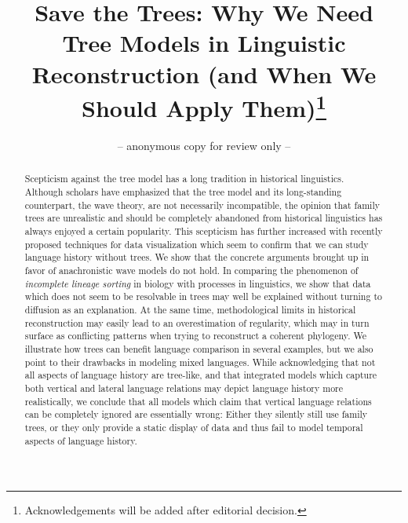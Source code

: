 \documentclass[svgnames,12pt]{scrartcl}
\title{Save the Trees: Why We Need Tree Models in Linguistic Reconstruction (and When We Should Apply Them)\footnote{Acknowledgements will be added after editorial decision.}}
\author{-- anonymous copy for review only --}
\begin{document}
\maketitle

\begin{abstract}
  \small
Scepticism against the tree model has a long tradition in historical linguistics.  
Although scholars
have emphasized that the tree model and its long-standing counterpart, the wave theory, are not
necessarily incompatible, the opinion that family trees are unrealistic and should be completely
abandoned from historical linguistics has always enjoyed a certain popularity. 
This scepticism has
further increased with recently proposed techniques for data visualization which seem to confirm
that we can study language history without trees.  
We show that the concrete arguments brought up in favor
of anachronistic wave models do not hold. In comparing the phenomenon of \emph{incomplete lineage
sorting} in biology with processes in linguistics, we show that data which does not seem to be
resolvable in trees may well be explained without turning to diffusion as an explanation. At the
same time, methodological limits in historical reconstruction may easily lead to an overestimation
of regularity, which may in turn surface as conflicting patterns when trying to reconstruct a
coherent phylogeny. We illustrate how trees can benefit language comparison in several examples, but 
we also
point to their drawbacks in modeling mixed languages.
While acknowledging that not all aspects of language history are tree-like, and
that integrated models which capture both vertical and lateral language relations may depict
language history more realistically, we conclude that all models which claim that vertical language
relations can be completely ignored are essentially wrong: Either they silently still use family
trees, or they only provide a static display of data and thus fail to model temporal aspects of
language history.
\end{abstract}
\end{document}
